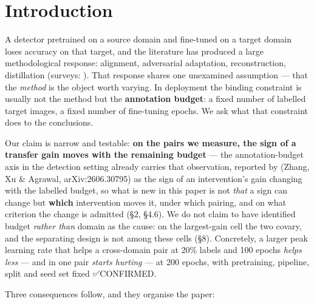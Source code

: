 \documentclass[pdflatex,sn-mathphys-ay]{sn-jnl}
\begin{document}
\section{Introduction}%

A detector pretrained on a source domain and fine-tuned on a target domain loses accuracy on that target, and the literature has produced a large methodological response: alignment, adversarial adaptation, reconstruction, distillation (surveys: \citep{oza2024,zhou2025}). That response shares one unexamined assumption --- that the \emph{method} is the object worth varying. In deployment the binding constraint is usually not the method but the \textbf{annotation budget}: a fixed number of labelled target images, a fixed number of fine-tuning epochs. We ask what that constraint does to the conclusions.

Our claim is narrow and testable: \textbf{on the pairs we measure, the sign of a transfer gain moves with the remaining budget} --- the annotation-budget axis in the detection setting already carries that observation, reported by \citep{zhang2026} (Zhang, Xu \& Agrawal, arXiv:2606.30795) as the sign of an intervention's gain changing with the labelled budget, so what is new in this paper is not \emph{that} a sign can change but \textbf{which} intervention moves it, under which pairing, and on what criterion the change is admitted (\S{}2, \S{}4.6). We do not claim to have identified budget \emph{rather than} domain as the cause: on the largest-gain cell the two covary, and the separating design is not among these cells (\S{}8). Concretely, a larger peak learning rate that helps a cross-domain pair at 20\% labels and 100 epochs \emph{helps less} --- and in one pair \emph{starts hurting} --- at 200 epochs, with pretraining, pipeline, split and seed set fixed ✅CONFIRMED.

Three consequences follow, and they organise the paper:
\end{document}
